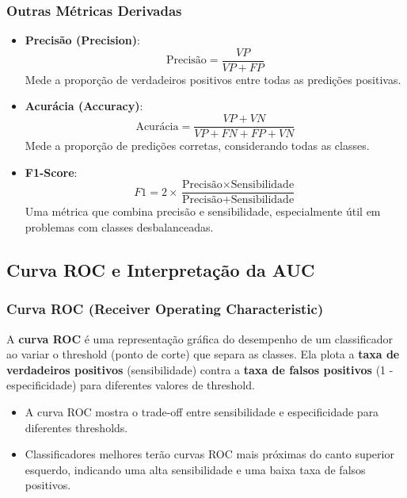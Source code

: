 \documentclass{sciposter}
\begin{document}
\begin{multicols}{3}
\subsubsection{Outras Métricas Derivadas}

\begin{itemize}
    \item \textbf{Precisão (Precision)}:
    \[
    \text{Precisão} = \frac{VP}{VP + FP}
    \]
    Mede a proporção de verdadeiros positivos entre todas as predições positivas.
    
    \item \textbf{Acurácia (Accuracy)}:
    \[
    \text{Acurácia} = \frac{VP + VN}{VP + FN + FP + VN}
    \]
    Mede a proporção de predições corretas, considerando todas as classes.
    
    \item \textbf{F1-Score}:
    \[
    F1 = 2 \times \frac{\text{Precisão} \times \text{Sensibilidade}}{\text{Precisão} + \text{Sensibilidade}}
    \]
    Uma métrica que combina precisão e sensibilidade, especialmente útil em problemas com classes desbalanceadas.
\end{itemize}

\subsection{Curva ROC e Interpretação da AUC}

\subsubsection{Curva ROC (Receiver Operating Characteristic)}

A \textbf{curva ROC} é uma representação gráfica do desempenho de um classificador ao variar o threshold (ponto de corte) que separa as classes. Ela plota a \textbf{taxa de verdadeiros positivos} (sensibilidade) contra a \textbf{taxa de falsos positivos} (1 - especificidade) para diferentes valores de threshold.

\begin{itemize}
    \item A curva ROC mostra o trade-off entre sensibilidade e especificidade para diferentes thresholds.
    \item Classificadores melhores terão curvas ROC mais próximas do canto superior esquerdo, indicando uma alta sensibilidade e uma baixa taxa de falsos positivos.
\end{itemize}


\end{multicols}
\end{document}

